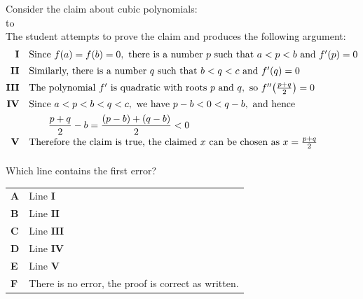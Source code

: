 \documentclass[11pt,a4paper]{article}
\begin{document}
\begin{enumerate}[label=\textbf{\arabic*.},leftmargin=*,itemsep=0pt,start=12]
Consider the claim about cubic polynomials: \\[-5pt]

\noindent\hbox to  \\

The student attempts to prove the claim and produces the following argument:
\[
\begin{array}{@{}rl@{}}
\mathbf{I} & \text{Since } f(a)=f(b)=0,\text{ there is a number }p\text{ such that }a<p<b\text{ and }f'(p)=0 \\[5pt]
\mathbf{II} & \text{Similarly, there is a number }q\text{ such that }b<q<c\text{ and }f'(q)=0 \\[5pt]
\mathbf{III} & \text{The polynomial }f'\text{ is quadratic with roots }p\text{ and }q,\text{ so }f''\!\left(\frac{p+q}{2}\right)=0 \\[5pt]
\mathbf{IV} &
\text{Since }a<p<b<q<c,\text{ we have }p-b<0<q-b,\text{ and hence}\\[4pt]
&\displaystyle\qquad
\frac{p+q}{2}-b
=\frac{(p-b)+(q-b)}{2}<0 \\[5pt]
\mathbf{V} & \text{Therefore the claim is true, the claimed } x \text{ can be chosen as } x=\frac{p+q}{2}\\[5pt]
\end{array}
\]

Which line contains the first error?

\par\vspace*{12pt}
\begin{tabularx}{\linewidth}{@{}>{\bfseries}l Y@{}}
A &
Line $\mathbf{I}$
\\[0.8em]
B &
Line $\mathbf{II}$
\\[0.8em]
C &
Line $\mathbf{III}$
\\[0.8em]
D &
Line $\mathbf{IV}$
\\[0.8em]
E &
Line $\mathbf{V}$
\\[0.8em]
F &
There is no error, the proof is correct as written.
\\
\end{tabularx}
\end{enumerate}
\end{document}
